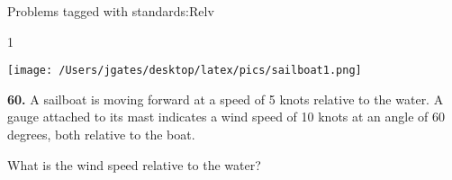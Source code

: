 

{\Large Problems tagged with standards:}Relv
\bigskip 

\AddToShipoutPicture*{\BackgroundPic}

\addtocounter {ProbNum} {1}

\begin{floatingfigure}[r]{.4\textwidth}
\texttt{[image: /Users/jgates/desktop/latex/pics/sailboat1.png]}
\end{floatingfigure}
 
{\bf \Large{60.}} A sailboat is moving forward at a speed of 5 knots relative to the water. A gauge attached to its mast indicates a wind speed of 10 knots at an angle of 60 degrees, both relative to the boat. 
\bigskip

\indent What is the wind speed relative to the water?

\bigskip
\vspace{20mm}